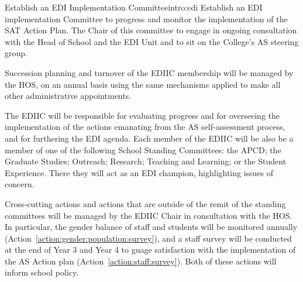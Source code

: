 \newcommand{\actintroedi}{Establish an EDI implementation Committee to progress and monitor the implementation of the SAT Action Plan. The Chair of this committee to engage in ongoing consultation with the Head of School and the EDI Unit and to sit on the College’s AS steering group.
}
\begin{actionblock}{\ksspace{}Establish an EDI Implementation Committee}{intro:edi}
\actintroedi
\hfill{
    \hypersetup{hidelinks}
    \hyperlink{a2}{\gotoactionsymbol{}}
}
\end{actionblock}
Succession planning and turnover of the EDIIC membership will be managed by the \ac{HOS}, on an annual basis using the same mechanisms applied to make all other administrative appointments. 

The EDIIC will be responsible for evaluating progress and for overseeing the implementation of the actions emanating from the AS self-assessment process, and for furthering the EDI agenda. Each member of the EDIIC will be also be a member of one of the following School Standing  Committees: the \ac{APCD}; the Graduate Studies; Outreach; Research; Teaching and Learning; or the Student Experience. There they will act as an EDI champion, highlighting issues of concern.





Cross-cutting actions and actions that are outside of the remit of the standing committees will be managed by the EDIIC Chair in consultation with the \ac{HOS}. In particular, the gender balance of staff and students will be monitored annually (Action~\ref{action:gender:population:survey}), and a staff survey will be conducted at the end of Year 3 and Year 4 to guage satisfaction with the implementation of the  AS Action plan (Action~\ref{action:staff:survey}). Both of these actions will inform school policy.

